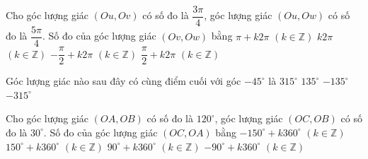 

\begin{ex}%
	Cho  góc lượng giác $(Ou, Ov)$ có số đo là $\dfrac{3\pi}{4}$, góc lượng giác $(Ou, Ow)$ có số đo là $\dfrac{5\pi}{4}$. Số đo của góc lượng giác $(Ov, Ow)$ bằng
	\choice 
		{$\pi+k  2\pi$ $(k \in \mathbb{Z})$}
		 {$k 2\pi$ $(k \in \mathbb{Z})$}
		{$-\dfrac{\pi}{2}+k  2\pi$ $(k \in \mathbb{Z})$}
		{\True  $\dfrac{\pi}{2}+k 2\pi$ $(k \in \mathbb{Z})$}
\end{ex}

\begin{ex}%
	Góc lượng giác nào sau đây có cùng điểm cuối với góc $-45^{\circ}$  là
	\choice 
		 {$315^{\circ}$}
		{$135^{\circ}$} 
		{$-135^{\circ}$} 
		 {\True $-315^{\circ}$}
\end{ex}

\begin{ex}%
	Cho góc lượng giác $(OA, OB)$ có số đo là $120^{\circ}$, góc lượng  giác $(OC, OB)$ có số đo là $30^{\circ}$. Số đo của góc lượng giác $(OC, OA)$ bằng
	\choice 
		{$-150^{\circ}+k 360^{\circ}$ $(k \in \mathbb{Z})$} 
		 {$150^{\circ}+k 360^{\circ}$ $(k \in \mathbb{Z})$}
		{$90^{\circ}+k 360^{\circ}$ $(k \in \mathbb{Z})$} 
		{\True $-90^{\circ}+k  360^{\circ}$ $(k \in \mathbb{Z})$}
\end{ex}

